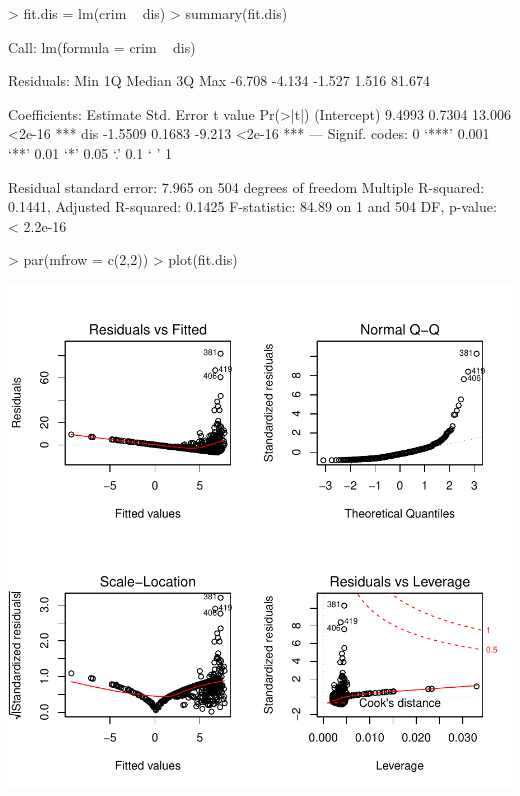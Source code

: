 \documentclass[a4paper]{article}
\begin{document}
\begin{Schunk}
\begin{Sinput}
> fit.dis = lm(crim ~ dis)
> summary(fit.dis)
\end{Sinput}
\begin{Soutput}
Call:
lm(formula = crim ~ dis)

Residuals:
   Min     1Q Median     3Q    Max 
-6.708 -4.134 -1.527  1.516 81.674 

Coefficients:
            Estimate Std. Error t value Pr(>|t|)    
(Intercept)   9.4993     0.7304  13.006   <2e-16 ***
dis          -1.5509     0.1683  -9.213   <2e-16 ***
---
Signif. codes:  0 ‘***’ 0.001 ‘**’ 0.01 ‘*’ 0.05 ‘.’ 0.1 ‘ ’ 1

Residual standard error: 7.965 on 504 degrees of freedom
Multiple R-squared:  0.1441,	Adjusted R-squared:  0.1425 
F-statistic: 84.89 on 1 and 504 DF,  p-value: < 2.2e-16
\end{Soutput}
\begin{Sinput}
> par(mfrow = c(2,2))
> plot(fit.dis)
\end{Sinput}
\end{Schunk}
\includegraphics{mutivariblelm-dis}
\end{document}
